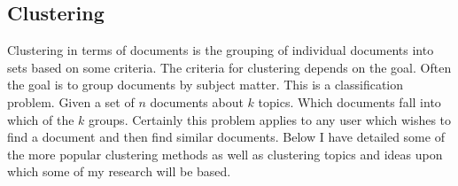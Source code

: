 \documentclass[11pt]{article}
\begin{document}
\subsection{Clustering}

Clustering in terms of documents is the grouping of individual documents into sets based on some criteria.
The criteria for clustering depends on the goal.
Often the goal is to group documents by subject matter.
This is a classification problem.
Given a set of $n$ documents about $k$ topics.
Which documents fall into which of the $k$ groups.
Certainly this problem applies to any user which wishes to find a document and then find similar documents.
Below I have detailed some of the more popular clustering methods as well as clustering topics and ideas upon which some of my research will be based.
\end{document}
